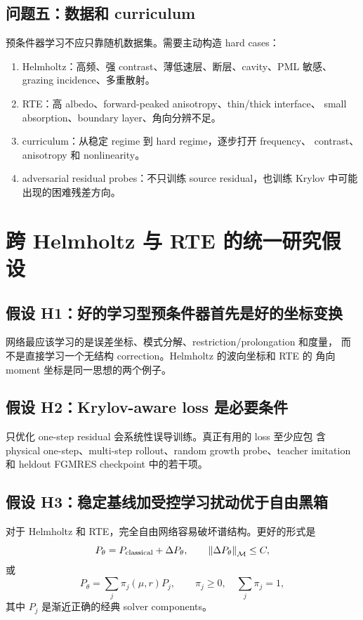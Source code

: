 \documentclass[UTF8,11pt,fontset=fandol]{ctexart}
\newcommand{\norm}[1]{\left\lVert #1 \right\rVert}
\begin{document}
\subsection{问题五：数据和 curriculum}

预条件器学习不应只靠随机数据集。需要主动构造 hard cases：
\begin{enumerate}[leftmargin=2em]
  \item Helmholtz：高频、强 contrast、薄低速层、断层、cavity、PML 敏感、
  grazing incidence、多重散射。
  \item RTE：高 albedo、forward-peaked anisotropy、thin/thick interface、
  small absorption、boundary layer、角向分辨不足。
  \item curriculum：从稳定 regime 到 hard regime，逐步打开 frequency、
  contrast、anisotropy 和 nonlinearity。
  \item adversarial residual probes：不只训练 source residual，也训练
  Krylov 中可能出现的困难残差方向。
\end{enumerate}

\section{跨 Helmholtz 与 RTE 的统一研究假设}

\subsection*{假设 H1：好的学习型预条件器首先是好的坐标变换}

网络最应该学习的是误差坐标、模式分解、restriction/prolongation 和度量，
而不是直接学习一个无结构 correction。Helmholtz 的波向坐标和 RTE 的
角向 moment 坐标是同一思想的两个例子。

\subsection*{假设 H2：Krylov-aware loss 是必要条件}

只优化 one-step residual 会系统性误导训练。真正有用的 loss 至少应包
含 physical one-step、multi-step rollout、random growth probe、teacher
imitation 和 heldout FGMRES checkpoint 中的若干项。

\subsection*{假设 H3：稳定基线加受控学习扰动优于自由黑箱}

对于 Helmholtz 和 RTE，完全自由网络容易破坏谱结构。更好的形式是
\[
  P_\theta = P_{\rm classical} + \Delta P_\theta,
  \qquad
  \norm{\Delta P_\theta}_{\mathcal{M}}\le C,
\]
或
\[
  P_\theta = \sum_j \pi_j(\mu,r) P_j,
  \qquad
  \pi_j\ge 0,\quad \sum_j\pi_j=1,
\]
其中 \(P_j\) 是渐近正确的经典 solver components。
\end{document}
